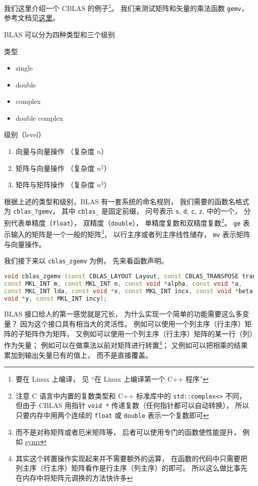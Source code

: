 我们这里介绍一个 CBLAS 的例子\footnote{要在 Linux 上编译， 见 “在 Linux 上编译第一个 C++ 程序”}。 我们来测试矩阵和矢量的乘法函数 \verb|gemv|， 参考文档见\href{https://software.intel.com/en-us/node/834919#88940C4E-0889-46C3-B6CF-F8B6EA6CF4BC}{这里}。

BLAS 可以分为四种类型和三个级别

类型
\begin{itemize}
    \item single
    \item double
    \item complex
    \item double complex
\end{itemize}

级别（level）
\begin{enumerate}
    \item 向量与向量操作 （复杂度 $n$）
    \item 矩阵与向量操作 （复杂度 $n^2$）
    \item 矩阵与矩阵操作 （复杂度 $n^3$）
\end{enumerate}

根据上述的类型和级别，BLAS 有一套系统的命名规则，
我们需要的函数名格式为 \verb|cblas_?gemv|， 其中 \verb|cblas_| 是固定前缀， 问号表示 \verb|s|, \verb|d|, \verb|c|, \verb|z|, 中的一个， 分别代表单精度（\verb|float|）， 双精度（\verb|double|）， 单精度复数和双精度复数\footnote{注意 C 语言中内置的复数类型和 C++ 标准库中的 \lstinline|std::complex<>| 不同， 但由于 CBLAS 用指针 \lstinline|void *| 传递复数（任何指针都可以自动转换）， 所以只要内存中用两个连续的 \lstinline|float| 或 \lstinline|double| 表示一个复数即可}。 \verb|ge| 表示输入的矩阵是一个一般的矩阵\footnote{而不是对称矩阵或者厄米矩阵等， 后者可以使用专门的函数使性能提升， 例如 \href{https://software.intel.com/en-us/node/834934}{symv}}， 以行主序或者列主序线性储存， \lstinline|mv| 表示矩阵与向量操作。 

我们接下来以 \verb|cblas_zgemv| 为例， 先来看函数声明。
\begin{lstlisting}[language=cpp]
void cblas_zgemv (const CBLAS_LAYOUT Layout, const CBLAS_TRANSPOSE trans,
const MKL_INT m, const MKL_INT n, const void *alpha, const void *a,
const MKL_INT lda, const void *x, const MKL_INT incx, const void *beta,
void *y, const MKL_INT incy);
\end{lstlisting}

BLAS 接口给人的第一感觉就是冗长， 为什么实现一个简单的功能需要这么多变量？ 因为这个接口具有相当大的灵活性。 例如可以使用一个列主序（行主序）矩阵的子矩阵作为矩阵， 又例如可以使用一个列主序（行主序）矩阵的某一行（列）作为矢量； 例如可以在做乘法以前对矩阵进行转置\footnote{其实这个转置操作实现起来并不需要额外的运算， 在函数的代码中只需要把列主序（行主序）矩阵看作是行主序（列主序）的即可。 所以这么做比事先在内存中将矩阵元调换的方法快许多}； 又例如可以把相乘的结果累加到输出矢量已有的值上， 而不是直接覆盖。

